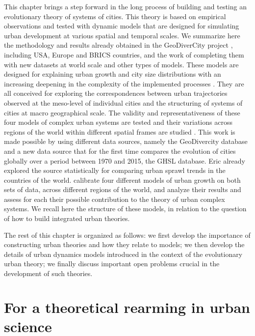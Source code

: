 \documentclass[10pt,letterpaper]{article}
\begin{document}
This chapter brings a step forward in the long process of building and testing an evolutionary theory of systems of cities. This theory is based on empirical observations and tested with dynamic models that are designed for simulating urban development at various spatial and temporal scales. We summarize here the methodology and results already obtained in the GeoDiverCity project \citep{pumain2015multilevel,cura2017old,pumain2017urban}, including USA, Europe and BRICS countries, and the work of \cite{raimbault2020empowering} completing them with new datasets at world scale and other types of models. These models are designed for explaining urban growth and city size distributions with an increasing deepening in the complexity of the implemented processes \cite{cottineau2015growing}. They are all conceived for exploring the correspondences between urban trajectories observed at the meso-level of individual cities and the structuring of systems of cities at macro geographical scale. The validity and representativeness of these four models of complex urban systems are tested and their variations across regions of the world within different spatial frames are studied \citep{raimbault2018calibration,raimbault2020indirect}. This work is made possible by using different data sources, namely the GeoDivercity database and a new data source that for the first time compares the evolution of cities globally over a period between 1970 and 2015, the GHSL database. Eric \cite{denis2020more} already explored the source statistically for comparing urban sprawl trends in the countries of the world. \cite{raimbault2020empowering} calibrate four different models of urban growth on both sets of data, across different regions of the world, and analyze their results and assess for each their possible contribution to the theory of urban complex systems. We recall here the structure of these models, in relation to the question of how to build integrated urban theories.

The rest of this chapter is organized as follows: we first develop the importance of constructing urban theories and how they relate to models; we then develop the details of urban dynamics models introduced in the context of the evolutionary urban theory; we finally discuss important open problems crucial in the development of such theories.


\section{For a theoretical rearming in urban science}
\end{document}
